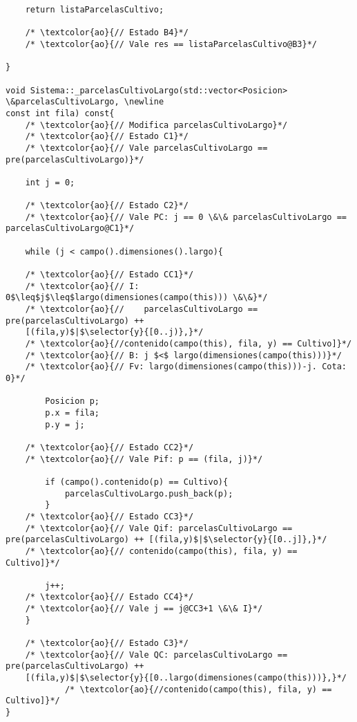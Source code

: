 \begin{lstlisting}
    return listaParcelasCultivo;
    
    /* \textcolor{ao}{// Estado B4}*/	    
    /* \textcolor{ao}{// Vale res == listaParcelasCultivo@B3}*/    
    
}

void Sistema::_parcelasCultivoLargo(std::vector<Posicion> \&parcelasCultivoLargo, \newline  
const int fila) const{
	/* \textcolor{ao}{// Modifica parcelasCultivoLargo}*/	        
    /* \textcolor{ao}{// Estado C1}*/	    
    /* \textcolor{ao}{// Vale parcelasCultivoLargo == pre(parcelasCultivoLargo)}*/      
    
    int j = 0;
	
	/* \textcolor{ao}{// Estado C2}*/	    
    /* \textcolor{ao}{// Vale PC: j == 0 \&\& parcelasCultivoLargo == parcelasCultivoLargo@C1}*/      
    
    while (j < campo().dimensiones().largo){

	/* \textcolor{ao}{// Estado CC1}*/	    
    /* \textcolor{ao}{// I: 0$\leq$j$\leq$largo(dimensiones(campo(this))) \&\&}*/        
    /* \textcolor{ao}{//    parcelasCultivoLargo == pre(parcelasCultivoLargo) ++ 
    [(fila,y)$|$\selector{y}{[0..j)},}*/
    /* \textcolor{ao}{//contenido(campo(this), fila, y) == Cultivo]}*/ 
    /* \textcolor{ao}{// B: j $<$ largo(dimensiones(campo(this)))}*/   
	/* \textcolor{ao}{// Fv: largo(dimensiones(campo(this)))-j. Cota: 0}*/
	     
        Posicion p;
        p.x = fila;
        p.y = j;

    /* \textcolor{ao}{// Estado CC2}*/   
	/* \textcolor{ao}{// Vale Pif: p == (fila, j)}*/
        
        if (campo().contenido(p) == Cultivo){
            parcelasCultivoLargo.push_back(p);
        }
	/* \textcolor{ao}{// Estado CC3}*/
	/* \textcolor{ao}{// Vale Qif: parcelasCultivoLargo == pre(parcelasCultivoLargo) ++ [(fila,y)$|$\selector{y}{[0..j]},}*/
	/* \textcolor{ao}{// contenido(campo(this), fila, y) == Cultivo]}*/

        j++;
    /* \textcolor{ao}{// Estado CC4}*/   
	/* \textcolor{ao}{// Vale j == j@CC3+1 \&\& I}*/
    }
	
	/* \textcolor{ao}{// Estado C3}*/	    
    /* \textcolor{ao}{// Vale QC: parcelasCultivoLargo == pre(parcelasCultivoLargo) ++ 
    [(fila,y)$|$\selector{y}{[0..largo(dimensiones(campo(this)))},}*/
    		/* \textcolor{ao}{//contenido(campo(this), fila, y) == Cultivo]}*/      
}


\end{lstlisting}
